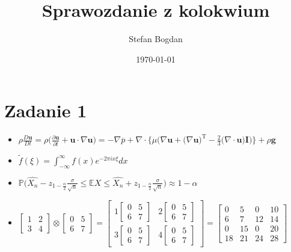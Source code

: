 \documentclass[a4paper, 11pt]{article}
\author{Stefan Bogdan}
\title{Sprawozdanie z kolokwium}
\date{\today}
\begin{document}
\maketitle
\section*{Zadanie 1}
\begin{itemize}
    \item $ \rho \frac{D \textbf{u}}{Dt} = \rho \big( \frac{\partial \textbf{u}}{\partial t} + \textbf{u} \cdot \nabla
            \textbf{u} \big) = - \nabla \overline{p} + \nabla \cdot \big \{ \mu \big( \nabla \textbf{u} + \big( \nabla 
            \textbf{u} \big) ^\text{T} - \frac{2}{3} \big( \nabla \cdot \textbf{u} \big) \textbf{I} \big) \big \} + \rho
            \textbf{g} $
            
    \item $ \tilde{f}(\xi) = \int^\infty_{-\infty} f(x) e^{-2\pi ix \xi} dx $
    
    \item $ \mathbb{P} \big( \hat{X_n} - z_{1 - \frac{\alpha}{2}} \frac{\sigma}{\sqrt{n}} \leqslant \mathbb{E}X 
            \leqslant \hat{X_n} + z_{1 - \frac{\alpha}{2}} \frac{\sigma}{\sqrt{n}} \big) \approx 1 - \alpha $
            
    \item $ \begin{bmatrix} 1 & 2 \\ 3 & 4 \end{bmatrix} \otimes \begin{bmatrix} 0 & 5 \\ 6 & 7 \end{bmatrix} = 
            \begin{bmatrix} 
            1 \begin{bmatrix} 0 & 5 \\ 6 & 7 \end{bmatrix} & 2 \begin{bmatrix} 0 & 5 \\ 6 & 7 \end{bmatrix} \\
            3 \begin{bmatrix} 0 & 5 \\ 6 & 7 \end{bmatrix} & 4 \begin{bmatrix} 0 & 5 \\ 6 & 7 \end{bmatrix}
            \end{bmatrix} =
            \begin{bmatrix} 0 & 5 & 0 & 10 \\ 6 & 7 & 12 & 14 \\ 0 & 15 & 0 & 20 \\ 18 & 21 & 24 & 28 \end{bmatrix}
          $
\end{itemize}
\end{document}
